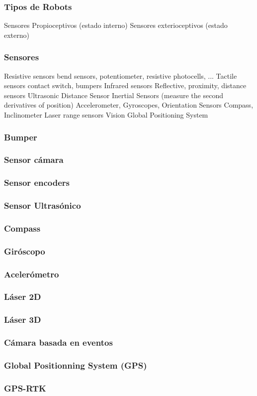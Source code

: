 \begin{frame}
    \frametitle{Tipos de Robots}
    
    Sensores Propioceptivos (estado interno)
    Sensores exterioceptivos (estado externo)
    
\end{frame}


\begin{frame}
    \frametitle{Sensores}
    Resistive sensors
    bend sensors, potentiometer, resistive
    photocells, ...
    Tactile sensors
    contact switch, bumpers
    Infrared sensors
    Reflective, proximity, distance sensors
    Ultrasonic Distance Sensor
    Inertial Sensors (measure the second derivatives
    of position)
    Accelerometer, Gyroscopes,
    Orientation Sensors
    Compass, Inclinometer
    Laser range sensors
    Vision
    Global Positioning System
\end{frame}


\begin{frame}
	\frametitle{Bumper}
	
\end{frame}

\begin{frame}
	\frametitle{Sensor cámara}

\end{frame}

\begin{frame}
	\frametitle{Sensor encoders}
	
\end{frame}

\begin{frame}
	\frametitle{Sensor Ultrasónico}
	
\end{frame}

\begin{frame}
	\frametitle{Compass}
	
\end{frame}

\begin{frame}
	\frametitle{Giróscopo}
	
\end{frame}

\begin{frame}
	\frametitle{Acelerómetro}
	
\end{frame}

\begin{frame}
	\frametitle{Láser 2D}
	
\end{frame}

\begin{frame}
	\frametitle{Láser 3D}
	
\end{frame}

\begin{frame}
	\frametitle{Cámara basada en eventos}
	
\end{frame}

\begin{frame}
	\frametitle{Global Positionning System (GPS)}
	
\end{frame}

\begin{frame}
	\frametitle{GPS-RTK}
	
\end{frame}



